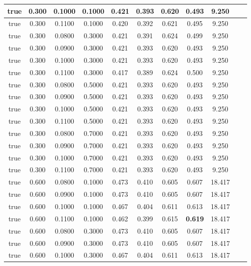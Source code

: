 \begin{longtable}[c]{|c|c|c|c|c|c|c|c|c|c|c|}
 true & 0.300 & 0.1000 & 0.1000 & 0.421 & 0.393 & 0.620 & 0.493 & 9.250  \\ \hline 
 true & 0.300 & 0.1100 & 0.1000 & 0.420 & 0.392 & 0.621 & 0.495 & 9.250  \\ \hline 
 true & 0.300 & 0.0800 & 0.3000 & 0.421 & 0.391 & 0.624 & 0.499 & 9.250  \\ \hline 
 true & 0.300 & 0.0900 & 0.3000 & 0.421 & 0.393 & 0.620 & 0.493 & 9.250  \\ \hline 
 true & 0.300 & 0.1000 & 0.3000 & 0.421 & 0.393 & 0.620 & 0.493 & 9.250  \\ \hline 
 true & 0.300 & 0.1100 & 0.3000 & 0.417 & 0.389 & 0.624 & 0.500 & 9.250  \\ \hline 
 true & 0.300 & 0.0800 & 0.5000 & 0.421 & 0.393 & 0.620 & 0.493 & 9.250  \\ \hline 
 true & 0.300 & 0.0900 & 0.5000 & 0.421 & 0.393 & 0.620 & 0.493 & 9.250  \\ \hline 
 true & 0.300 & 0.1000 & 0.5000 & 0.421 & 0.393 & 0.620 & 0.493 & 9.250  \\ \hline 
 true & 0.300 & 0.1100 & 0.5000 & 0.421 & 0.393 & 0.620 & 0.493 & 9.250  \\ \hline 
 true & 0.300 & 0.0800 & 0.7000 & 0.421 & 0.393 & 0.620 & 0.493 & 9.250  \\ \hline 
 true & 0.300 & 0.0900 & 0.7000 & 0.421 & 0.393 & 0.620 & 0.493 & 9.250  \\ \hline 
 true & 0.300 & 0.1000 & 0.7000 & 0.421 & 0.393 & 0.620 & 0.493 & 9.250  \\ \hline 
 true & 0.300 & 0.1100 & 0.7000 & 0.421 & 0.393 & 0.620 & 0.493 & 9.250  \\ \hline 
 true & 0.600 & 0.0800 & 0.1000 & 0.473 & 0.410 & 0.605 & 0.607 & 18.417  \\ \hline 
 true & 0.600 & 0.0900 & 0.1000 & 0.473 & 0.410 & 0.605 & 0.607 & 18.417  \\ \hline 
 true & 0.600 & 0.1000 & 0.1000 & 0.467 & 0.404 & 0.611 & 0.613 & 18.417  \\ \hline 
 true & 0.600 & 0.1100 & 0.1000 & 0.462 & 0.399 & 0.615 & \cellcolor{gray!20} \textbf{0.619} & 18.417  \\ \hline 
 true & 0.600 & 0.0800 & 0.3000 & 0.473 & 0.410 & 0.605 & 0.607 & 18.417  \\ \hline 
 true & 0.600 & 0.0900 & 0.3000 & 0.473 & 0.410 & 0.605 & 0.607 & 18.417  \\ \hline 
 true & 0.600 & 0.1000 & 0.3000 & 0.467 & 0.404 & 0.611 & 0.613 & 18.417  \\ \hline 

\end{longtable}

